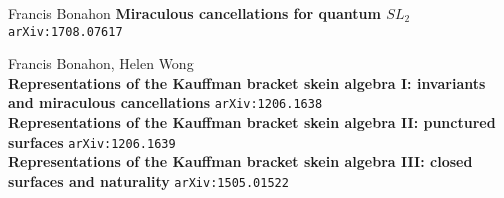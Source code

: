 \documentclass[12pt]{article}
\begin{document}
\begin{thebibliography}{}

\item Francis Bonahon \textbf{Miraculous cancellations for quantum $SL_2$} \texttt{arXiv:1708.07617}

\item Francis Bonahon, Helen Wong \\ 
\textbf{Representations of the Kauffman bracket skein algebra I: invariants and miraculous cancellations} \texttt{arXiv:1206.1638} \\
\textbf{Representations of the Kauffman bracket skein algebra II: punctured surfaces
} \texttt{arXiv:1206.1639} \\
\textbf{Representations of the Kauffman bracket skein algebra III: closed surfaces and naturality} \texttt{arXiv:1505.01522} 

\end{thebibliography}
\end{document}
